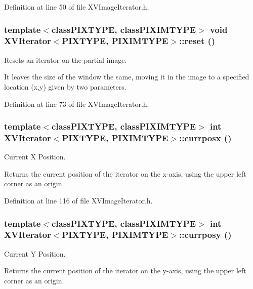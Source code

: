 Definition at line 50 of file XVImage\-Iterator.h.\label{XVIterator_a3}
\hypertarget{class_XVIterator_a3}{
\subsubsection[reset]{\setlength{\rightskip}{0pt plus 5cm}template$<$classPIXTYPE, classPIXIMTYPE$>$ void XVIterator$<$PIXTYPE, PIXIMTYPE$>$::reset ()}}


Resets an iterator on the partial image.

It leaves the size of the window the same, moving it in the image to a specified location (x,y) given by two parameters. 

Definition at line 73 of file XVImage\-Iterator.h.\label{XVIterator_a7}
\hypertarget{class_XVIterator_a7}{
\subsubsection[currposx]{\setlength{\rightskip}{0pt plus 5cm}template$<$classPIXTYPE, classPIXIMTYPE$>$ int XVIterator$<$PIXTYPE, PIXIMTYPE$>$::currposx ()}}


Current X Position.

Returns the current position of the iterator on the x-axis, using the upper left corner as an origin. 

Definition at line 116 of file XVImage\-Iterator.h.\label{XVIterator_a8}
\hypertarget{class_XVIterator_a8}{
\subsubsection[currposy]{\setlength{\rightskip}{0pt plus 5cm}template$<$classPIXTYPE, classPIXIMTYPE$>$ int XVIterator$<$PIXTYPE, PIXIMTYPE$>$::currposy ()}}


Current Y Position.

Returns the current position of the iterator on the y-axis, using the upper left corner as an origin. 

